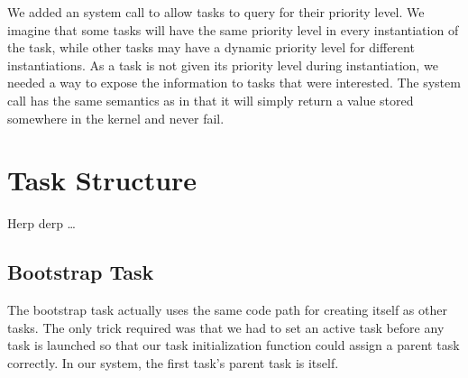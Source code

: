 \documentclass[pdftex,10pt,a4paper]{article}
\begin{document}
We added an  system call to allow tasks to query
for their priority level. We imagine that some tasks will have the
same priority level in every instantiation of the task, while other
tasks may have a dynamic priority level for different
instantiations. As a task is not given its priority level during
instantiation, we needed a way to expose the information to tasks that
were interested. The  system call has the same
semantics as  in that it will simply return a value
stored somewhere in the kernel and never fail.

\section*{Task Structure}

Herp derp \ldots

\subsection*{Bootstrap Task}

The bootstrap task actually uses the same code path for creating
itself as other tasks. The only trick required was that we had to set
an active task before any task is launched so that our task
initialization function could assign a parent task correctly. In our
system, the first task's parent task is itself.
\end{document}
